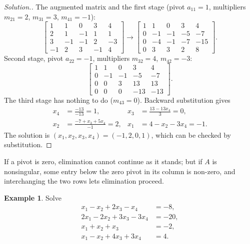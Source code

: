\documentclass[11pt,a4paper]{article}
\numberwithin{equation}{section}
\theoremstyle{definition}
\newtheorem{exa}[thm]{Example}
\newenvironment{solution}
  {\renewcommand{\qedsymbol}{}\begin{proof}[\textit{Solution}.]}
  {\end{proof}}
\begin{document}
\begin{solution}
The augmented matrix and the first stage (pivot $a_{11} = 1$, multipliers $m_{21} = 2$, $m_{31} = 3$, $m_{41} = -1$):
$$\left[\begin{array}{rrrr|r}1&1&0&3&4\\2&1&-1&1&1\\3&-1&-1&2&-3\\-1&2&3&-1&4\end{array}\right]\longrightarrow
\left[\begin{array}{rrrr|r}1&1&0&3&4\\0&-1&-1&-5&-7\\0&-4&-1&-7&-15\\0&3&3&2&8\end{array}\right].$$
Second stage, pivot $a_{22} = -1$, multipliers $m_{32} = 4$, $m_{42} = -3$:
$$\left[\begin{array}{rrrr|r}1&1&0&3&4\\0&-1&-1&-5&-7\\0&0&3&13&13\\0&0&0&-13&-13\end{array}\right].$$
The third stage has nothing to do ($m_{43} = 0$). Backward substitution gives
\begin{align*}
x_4 &= \frac{-13}{-13} = 1, & x_3 &= \frac{13-13x_4}{3} = 0,\\
x_2 &= \frac{-7+x_3+5x_4}{-1} = 2, & x_1 &= 4-x_2-3x_4 = -1 .
\end{align*}
The solution is $(x_1,x_2,x_3,x_4) = (-1,2,0,1)$, which can be checked by substitution.
\end{solution}

If a pivot is zero, elimination cannot continue as it stands; but if $A$ is nonsingular, some entry below the zero pivot in its column is
non-zero, and interchanging the two rows lets elimination proceed.

\begin{exa}
\label{exa:gaussswap}
Solve
\begin{align*}
x_1-x_2+2x_3-x_4 &= -8,\\
2x_1-2x_2+3x_3-3x_4 &= -20,\\
x_1+x_2+x_3 &= -2,\\
x_1-x_2+4x_3+3x_4 &= 4 .
\end{align*}
\end{exa}
\end{document}
